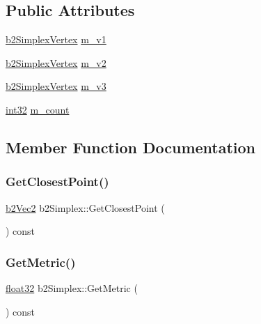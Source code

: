 \subsection*{Public Attributes}
\begin{DoxyCompactItemize}
\item 
\mbox{\hyperlink{structb2_simplex_vertex}{b2\+Simplex\+Vertex}} \mbox{\hyperlink{structb2_simplex_a974d030fe572112e6d5212520586eb13}{m\+\_\+v1}}
\item 
\mbox{\hyperlink{structb2_simplex_vertex}{b2\+Simplex\+Vertex}} \mbox{\hyperlink{structb2_simplex_a1732c0f9d63e7cdbd405e7a7b2c7b7cb}{m\+\_\+v2}}
\item 
\mbox{\hyperlink{structb2_simplex_vertex}{b2\+Simplex\+Vertex}} \mbox{\hyperlink{structb2_simplex_a42ede9ec641aea34e51baf1b43e9ea07}{m\+\_\+v3}}
\item 
\mbox{\hyperlink{b2_settings_8h_a43d43196463bde49cb067f5c20ab8481}{int32}} \mbox{\hyperlink{structb2_simplex_ad11c352a25ee324f438515fb8028bd23}{m\+\_\+count}}
\end{DoxyCompactItemize}


\subsection{Member Function Documentation}
\mbox{\label{structb2_simplex_a2044bf067dd5f65d63f96ca6e1dded45}} 
\subsubsection{\texorpdfstring{GetClosestPoint()}{GetClosestPoint()}}
{\footnotesize\ttfamily \mbox{\hyperlink{structb2_vec2}{b2\+Vec2}} b2\+Simplex\+::\+Get\+Closest\+Point (\begin{DoxyParamCaption}{ }\end{DoxyParamCaption}) const\hspace{0.3cm}{\ttfamily [inline]}}

\mbox{\label{structb2_simplex_a9ca3fb6a480b36f80c3eadfb2b387d02}} 
\subsubsection{\texorpdfstring{GetMetric()}{GetMetric()}}
{\footnotesize\ttfamily \mbox{\hyperlink{b2_settings_8h_aacdc525d6f7bddb3ae95d5c311bd06a1}{float32}} b2\+Simplex\+::\+Get\+Metric (\begin{DoxyParamCaption}{ }\end{DoxyParamCaption}) const\hspace{0.3cm}{\ttfamily [inline]}}

